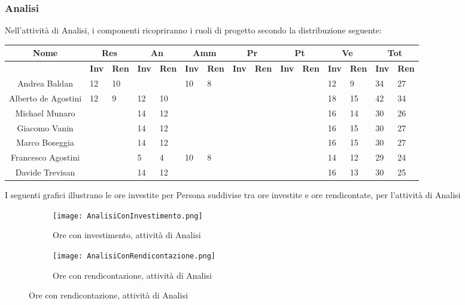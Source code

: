 \documentclass{scalatekids-article}
\begin{document}
\subsubsection{Analisi}
Nell'attività di Analisi, i componenti ricopriranno i ruoli di progetto secondo la distribuzione seguente:
\begin{center}
  \scriptsize
  \begin{tabular}{| c | p{0.35cm} p{0.35cm} | p{0.35cm} p{0.35cm} | p{0.35cm} p{0.35cm} | p{0.35cm} p{0.35cm} | p{0.35cm} p{0.35cm} | p{0.35cm} p{0.35cm} | p{0.35cm} p{0.35cm} |}
    \hline
    \textbf{Nome} & \multicolumn{2}{|c|}{\textbf{Res}} & \multicolumn{2}{|c|}{\textbf{An}} & \multicolumn{2}{|c|}{\textbf{Amm}} & \multicolumn{2}{|c|}{\textbf{Pr}} & \multicolumn{2}{|c|}{\textbf{Pt}} & \multicolumn{2}{|c|}{\textbf{Ve}} & \multicolumn{2}{|c|}{\textbf{Tot}}\\
    \hline
    & \textbf{Inv} & \textbf{Ren} & \textbf{Inv} & \textbf{Ren} & \textbf{Inv} & \textbf{Ren} & \textbf{Inv} & \textbf{Ren} & \textbf{Inv} & \textbf{Ren} & \textbf{Inv} & \textbf{Ren} & \textbf{Inv} & \textbf{Ren}\\
    \hline
    Andrea Baldan & 12 & 10 & & & 10 & 8 & & & & & 12 & 9 & 34 & 27\\
    Alberto de Agostini & 12 & 9 & 12 & 10 & & & & & & & 18 & 15 & 42 & 34\\
    Michael Munaro & & & 14 & 12 & & & & & & & 16 & 14 & 30 & 26\\
    Giacomo Vanin & & & 14 & 12 & & & & & & & 16 & 15 & 30 & 27\\
    Marco Boseggia & & & 14 & 12 & & & & & & & 16 & 15 & 30 & 27\\
    Francesco Agostini & & & 5 & 4 & 10 & 8 & & & & & 14 & 12 & 29 & 24\\
    Davide Trevisan & & & 14 & 12 & & & & & & & 16 & 13 & 30 & 25\\
    \hline
  \end{tabular}
\end{center}
I seguenti grafici illustrano le ore investite per Persona suddivise tra ore investite e ore rendicontate, per l'attività di Analisi
\begin{figure}[H]
  \begin{subfigure}[H]{0.47\textwidth}
    \texttt{[image: AnalisiConInvestimento.png]}
    \caption{Ore con investimento, attività di Analisi}
  \end{subfigure}
  \qquad
  \begin{subfigure}[H]{0.47\textwidth}
    \texttt{[image: AnalisiConRendicontazione.png]}
    \caption{Ore con rendicontazione, attività di Analisi}
  \end{subfigure}
\end{figure}
\end{document}
